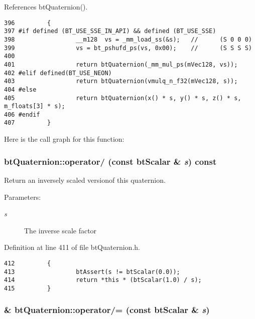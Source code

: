 References btQuaternion().

\begin{Code}\begin{verbatim}396         {
397 #if defined (BT_USE_SSE_IN_API) && defined (BT_USE_SSE)
398                 __m128  vs = _mm_load_ss(&s);   //      (S 0 0 0)
399                 vs = bt_pshufd_ps(vs, 0x00);    //      (S S S S)
400                 
401                 return btQuaternion(_mm_mul_ps(mVec128, vs));
402 #elif defined(BT_USE_NEON)
403                 return btQuaternion(vmulq_n_f32(mVec128, s));
404 #else
405                 return btQuaternion(x() * s, y() * s, z() * s, m_floats[3] * s);
406 #endif
407         }
\end{verbatim}
\end{Code}




Here is the call graph for this function:\hypertarget{classbt_quaternion_4208a1ae41ae01d4dfa0d25792441213}{
\subsubsection[operator/]{ btQuaternion::operator/ (const btScalar \& {\em s}) const}}
\label{classbt_quaternion_4208a1ae41ae01d4dfa0d25792441213}


Return an inversely scaled versionof this quaternion. 

\begin{Desc}
\item[Parameters:]
\begin{description}
\item[{\em s}]The inverse scale factor \end{description}
\end{Desc}


Definition at line 411 of file btQuaternion.h.

\begin{Code}\begin{verbatim}412         {
413                 btAssert(s != btScalar(0.0));
414                 return *this * (btScalar(1.0) / s);
415         }
\end{verbatim}
\end{Code}


\hypertarget{classbt_quaternion_294fe99e7e5a8e0d45d111334e2e1552}{
\subsubsection[operator/=]{\& btQuaternion::operator/= (const btScalar \& {\em s})}}
\label{classbt_quaternion_294fe99e7e5a8e0d45d111334e2e1552}


